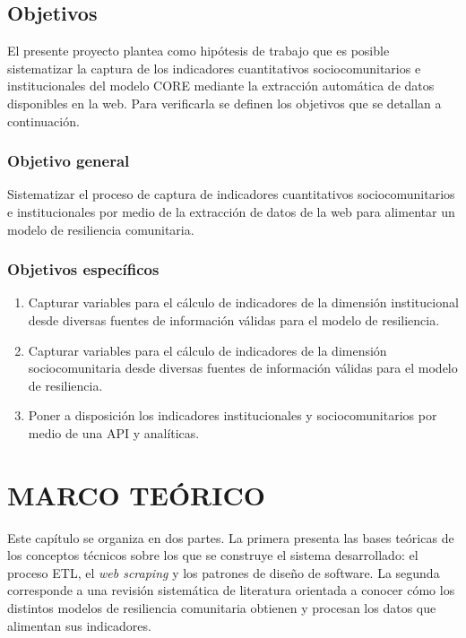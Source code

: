 \documentclass[12pt,letterpaper,oneside]{report}
\begin{document}
\section{Objetivos}
\label{sec:objetivos}

El presente proyecto plantea como hip\'otesis de trabajo que es posible sistematizar la captura de los indicadores cuantitativos sociocomunitarios e institucionales del modelo CORE mediante la extracci\'on autom\'atica de datos disponibles en la web. Para verificarla se definen los objetivos que se detallan a continuaci\'on.

\subsection{Objetivo general}
\label{sec:objetivo-general}

Sistematizar el proceso de captura de indicadores cuantitativos sociocomunitarios e institucionales por medio de la extracci\'on de datos de la web para alimentar un modelo de resiliencia comunitaria.

\subsection{Objetivos espec\'ificos}
\label{sec:objetivos-especificos}

\begin{enumerate}
  \item Capturar variables para el c\'alculo de indicadores de la dimensi\'on institucional desde diversas fuentes de informaci\'on v\'alidas para el modelo de resiliencia.
  \item Capturar variables para el c\'alculo de indicadores de la dimensi\'on sociocomunitaria desde diversas fuentes de informaci\'on v\'alidas para el modelo de resiliencia.
  \item Poner a disposici\'on los indicadores institucionales y sociocomunitarios por medio de una API y anal\'iticas.
\end{enumerate}


\chapter{MARCO TE\'ORICO}
\label{ch:marco-teorico}

Este cap\'itulo se organiza en dos partes. La primera presenta las bases te\'oricas de los conceptos t\'ecnicos sobre los que se construye el sistema desarrollado: el proceso ETL, el \textit{web scraping} y los patrones de dise\~no de software. La segunda corresponde a una revisi\'on sistem\'atica de literatura orientada a conocer c\'omo los distintos modelos de resiliencia comunitaria obtienen y procesan los datos que alimentan sus indicadores.
\end{document}
